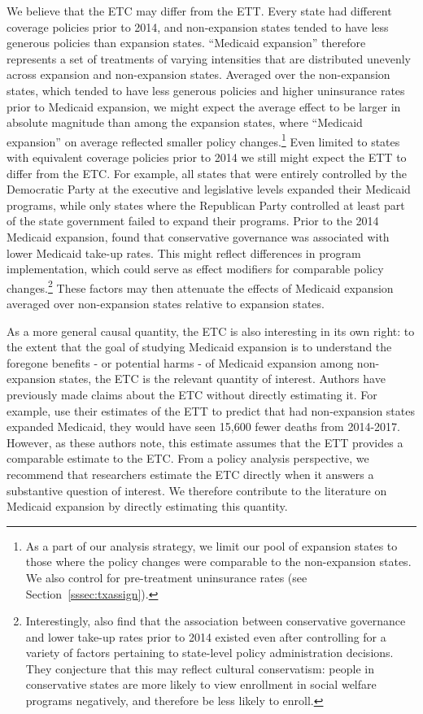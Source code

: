\documentclass[aoas]{imsart}
\theoremstyle{plain}
\theoremstyle{remark}
\begin{document}
We believe that the ETC may differ from the ETT. Every state had different coverage policies prior to 2014, and non-expansion states tended to have less generous policies than expansion states. ``Medicaid expansion'' therefore represents a set of treatments of varying intensities that are distributed unevenly across expansion and non-expansion states. Averaged over the non-expansion states, which tended to have less generous policies and higher uninsurance rates prior to Medicaid expansion, we might expect the average effect to be larger in absolute magnitude than among the expansion states, where ``Medicaid expansion'' on average reflected smaller policy changes.\footnote{As a part of our analysis strategy, we limit our pool of expansion states to those where the policy changes were comparable to the non-expansion states. We also control for pre-treatment uninsurance rates (see Section~\ref{sssec:txassign}).} Even limited to states with equivalent coverage policies prior to 2014 we still might expect the ETT to differ from the ETC. For example, all states that were entirely controlled by the Democratic Party at the executive and legislative levels expanded their Medicaid programs, while only states where the Republican Party controlled at least part of the state government failed to expand their programs. Prior to the 2014 Medicaid expansion, \cite{sommers2012understanding} found that conservative governance was associated with lower Medicaid take-up rates. This might reflect differences in program implementation, which could serve as effect modifiers for comparable policy changes.\footnote{Interestingly, \cite{sommers2012understanding} also find that the association between conservative governance and lower take-up rates prior to 2014 existed even after controlling for a variety of factors pertaining to state-level policy administration decisions. They conjecture that this may reflect cultural conservatism: people in conservative states are more likely to view enrollment in social welfare programs negatively, and therefore be less likely to enroll.} These factors may then attenuate the effects of Medicaid expansion averaged over non-expansion states relative to expansion states.

As a more general causal quantity, the ETC is also interesting in its own right: to the extent that the goal of studying Medicaid expansion is to understand the foregone benefits - or potential harms - of Medicaid expansion among non-expansion states, the ETC is the relevant quantity of interest. Authors have previously made claims about the ETC without directly estimating it. For example, \cite{miller2019medicaid} use their estimates of the ETT to predict that had non-expansion states expanded Medicaid, they would have seen 15,600 fewer deaths from 2014-2017. However, as these authors note, this estimate assumes that the ETT provides a comparable estimate to the ETC. From a policy analysis perspective, we recommend that researchers estimate the ETC directly when it answers a substantive question of interest. We therefore contribute to the literature on Medicaid expansion by directly estimating this quantity.
\end{document}
